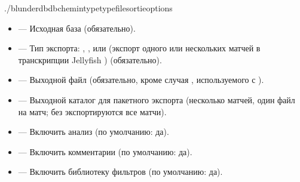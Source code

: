 \documentclass[letterpaper,10pt,russian]{sphinxmanual}
\begin{document}
\begin{sphinxVerbatim}[commandchars=\\\{\}]
./blunderdb\PYGZhy{}\PYGZhy{}db\PYGZlt{}chemin\PYGZgt{}\PYGZhy{}\PYGZhy{}type\PYGZlt{}type\PYGZgt{}\PYGZhy{}\PYGZhy{}file\PYGZlt{}sortie\PYGZgt{}\PYG{o}{[}options\PYG{o}{]}
\end{sphinxVerbatim}

\sphinxAtStartPar
{}
\begin{itemize}
\item {} 
\sphinxAtStartPar
{} — Исходная база (обязательно).

\item {} 
\sphinxAtStartPar
{} — Тип экспорта: , ,  или  (экспорт одного или нескольких матчей в транскрипции Jellyfish ) (обязательно).

\item {} 
\sphinxAtStartPar
{} — Выходной файл (обязательно, кроме случая , используемого с ).

\item {} 
\sphinxAtStartPar
{} — Выходной каталог для пакетного экспорта  (несколько матчей, один файл на матч; без  экспортируются все матчи).

\item {} 
\sphinxAtStartPar
{} — Включить анализ (по умолчанию: да).

\item {} 
\sphinxAtStartPar
{} — Включить комментарии (по умолчанию: да).

\item {} 
\sphinxAtStartPar
{} — Включить библиотеку фильтров (по умолчанию: да).


\end{itemize}
\end{document}
